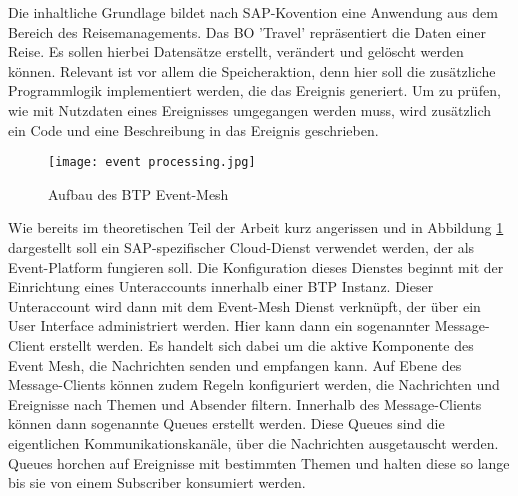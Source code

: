   Die inhaltliche Grundlage bildet nach SAP-Kovention eine Anwendung aus dem Bereich des Reisemanagements. Das \ac{BO} 'Travel' repräsentiert die Daten einer Reise. Es sollen hierbei Datensätze erstellt, verändert und gelöscht werden können. Relevant ist vor allem die Speicheraktion, denn hier soll die zusätzliche Programmlogik implementiert werden, die das Ereignis generiert. Um zu prüfen, wie mit Nutzdaten eines Ereignisses umgegangen werden muss, wird zusätzlich ein Code und eine Beschreibung in das Ereignis geschrieben.\\
  \begin{figure}
    \centering
    \texttt{[image: event processing.jpg]}
    \caption[Aufbau des BTP Event-Mesh]{Aufbau des BTP Event-Mesh \footnotemark}
    \label{EMprocessing}
  \end{figure}
  Wie bereits im theoretischen Teil der Arbeit kurz angerissen und in Abbildung \ref{EMprocessing} dargestellt soll ein SAP-spezifischer Cloud-Dienst verwendet werden, der als Event-Platform fungieren soll. Die Konfiguration dieses Dienstes beginnt mit der Einrichtung eines Unteraccounts innerhalb einer \ac{BTP} Instanz. Dieser Unteraccount wird dann mit dem Event-Mesh Dienst verknüpft, der über ein User Interface administriert werden. Hier kann dann ein sogenannter Message-Client erstellt werden. Es handelt sich dabei um die aktive Komponente des Event Mesh, die Nachrichten senden und empfangen kann. Auf Ebene des Message-Clients können zudem Regeln konfiguriert werden, die Nachrichten und Ereignisse nach Themen und Absender filtern. Innerhalb des Message-Clients können dann sogenannte Queues erstellt werden. Diese Queues sind die eigentlichen Kommunikationskanäle, über die Nachrichten ausgetauscht werden. Queues horchen auf Ereignisse mit bestimmten Themen und halten diese so lange bis sie von einem Subscriber konsumiert werden.\\ 
  
